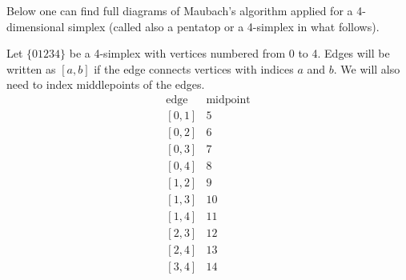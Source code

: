 \documentclass[a4paper,12pt]{amsart}
\numberwithin{equation}{section}
\begin{document}
Below one can find full diagrams of Maubach's algorithm applied for a 4-dimensional simplex (called also a pentatop or a 4-simplex in what follows).

Let $\{01234\}$ be a 4-simplex with vertices numbered from 0 to 4. Edges will be written as $[a,b]$ if the edge connects vertices with indices $a$ and $b$.
We will also need to index middlepoints of the edges. 
$$
\begin{array}{cc}
\mbox{edge} & \mbox{midpoint} \\
\left[0,1\right] & 5 \\
\left[0,2\right] & 6 \\
\left[0,3\right] & 7 \\
\left[0,4\right] & 8 \\
\left[1,2\right] & 9 \\
\left[1,3\right] & 10 \\
\left[1,4\right] & 11 \\
\left[2,3\right] & 12 \\
\left[2,4\right] & 13 \\
\left[3,4\right] & 14 \\
\end{array}
$$
\end{document}
